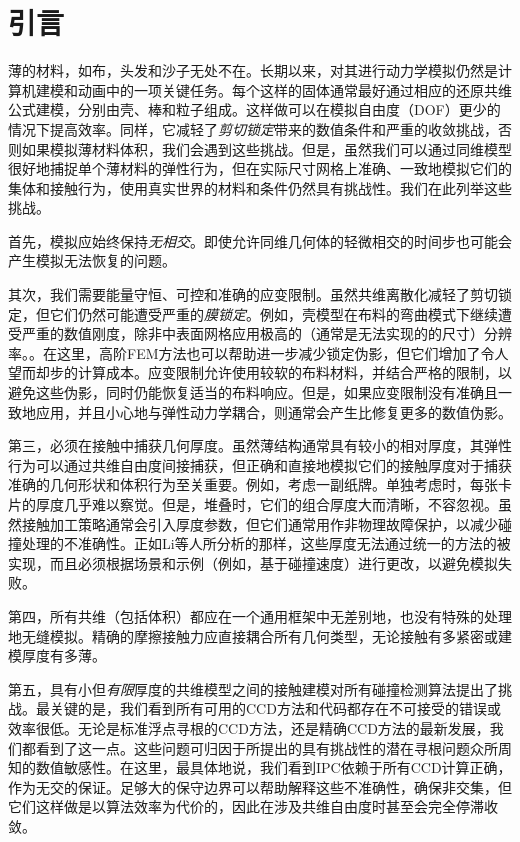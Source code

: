 
\section{引言}

薄的材料，如布，头发和沙子无处不在。长期以来，对其进行动力学模拟仍然是计算机建模和动画中的一项关键任务。每个这样的固体通常最好通过相应的还原共维公式建模，分别由壳、棒和粒子组成。这样做可以在模拟自由度（DOF）更少的情况下提高效率。同样，它减轻了\textit{剪切锁定}带来的数值条件和严重的收敛挑战，否则如果模拟薄材料体积，我们会遇到这些挑战。但是，虽然我们可以通过同维模型很好地捕捉单个薄材料的弹性行为，但在实际尺寸网格上准确、一致地模拟它们的集体和接触行为，使用真实世界的材料和条件仍然具有挑战性。我们在此列举这些挑战。

首先，模拟应始终保持\textit{无相交}。即使允许同维几何体的轻微相交的时间步也可能会产生模拟无法恢复的问题。

其次，我们需要能量守恒、可控和准确的应变限制。虽然共维离散化减轻了剪切锁定，但它们仍然可能遭受严重的\textit{膜锁定}。例如，壳模型在布料的弯曲模式下继续遭受严重的数值刚度，除非中表面网格应用极高的（通常是无法实现的的尺寸）分辨率。。在这里，高阶FEM方法也可以帮助进一步减少锁定伪影，但它们增加了令人望而却步的计算成本。应变限制允许使用较软的布料材料，并结合严格的限制，以避免这些伪影，同时仍能恢复适当的布料响应。但是，如果应变限制没有准确且一致地应用，并且小心地与弹性动力学耦合，则通常会产生比修复更多的数值伪影。

第三，必须在接触中捕获几何厚度。虽然薄结构通常具有较小的相对厚度，其弹性行为可以通过共维自由度间接捕获，但正确和直接地模拟它们的接触厚度对于捕获准确的几何形状和体积行为至关重要。例如，考虑一副纸牌。单独考虑时，每张卡片的厚度几乎难以察觉。但是，堆叠时，它们的组合厚度大而清晰，不容忽视。虽然接触加工策略通常会引入厚度参数，但它们通常用作非物理故障保护，以减少碰撞处理的不准确性。正如Li等人所分析的那样，这些厚度无法通过统一的方法的被实现，而且必须根据场景和示例（例如，基于碰撞速度）进行更改，以避免模拟失败。

第四，所有共维（包括体积）都应在一个通用框架中无差别地，也没有特殊的处理地无缝模拟。精确的摩擦接触力应直接耦合所有几何类型，无论接触有多紧密或建模厚度有多薄。

第五，具有小但\textit{有限}厚度的共维模型之间的接触建模对所有碰撞检测算法提出了挑战。最关键的是，我们看到所有可用的CCD方法和代码都存在不可接受的错误或效率很低。无论是标准浮点寻根的CCD方法，还是精确CCD方法的最新发展，我们都看到了这一点。这些问题可归因于所提出的具有挑战性的潜在寻根问题众所周知的数值敏感性。在这里，最具体地说，我们看到IPC依赖于所有CCD计算正确，作为无交的保证。足够大的保守边界可以帮助解释这些不准确性，确保非交集，但它们这样做是以算法效率为代价的，因此在涉及共维自由度时甚至会完全停滞收敛。

